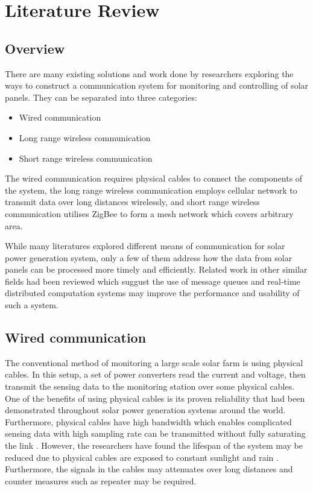 \documentclass[../thesis.tex]{subfiles}
\begin{document}
\chapter{Literature Review}


\section{Overview}
There are many existing solutions and work done by researchers exploring the ways to construct a communication system for monitoring and controlling of solar panels. They can be separated into three categories: 

\begin{itemize}
	\item Wired communication
	\item Long range wireless communication
	\item Short range wireless communication
\end{itemize}

The wired communication requires physical cables to connect the components of the system, the long range wireless communication employs cellular network to transmit data over long distances wirelessly, and short range wireless communication utilises ZigBee to form a mesh network which covers arbitrary area.

While many literatures explored different means of communication for solar power generation system, only a few of them address how the data from solar panels can be processed more timely and efficiently. Related work in other similar fields had been reviewed which suggust the use of message queues and real-time distributed computation systems may improve the performance and usability of such a system. 


\section{Wired communication}

The conventional method of monitoring a large scale solar farm is using physical cables. In this setup, a set of power converters read the current and voltage, then transmit the sensing data to the monitoring station over some physical cables. One of the benefits of using physical cables is its proven reliability that had been demonstrated throughout solar power generation systems around the world. Furthermore, physical cables have high bandwidth which enables complicated sensing data with high sampling rate can be transmitted without fully saturating the link \cite{SHARIFF20151730}. However, the researchers have found the lifespan of the system may be reduced due to physical cables are exposed to constant sunlight and rain \cite{SHARIFF20151730}. Furthermore, the signals in the cables may attenuates over long distances and counter measures such as repeater may be required. 
\end{document}

